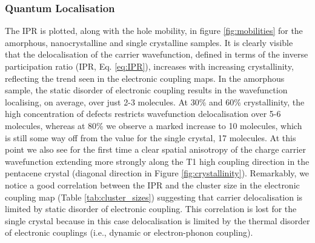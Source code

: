 \subsubsection{Quantum Localisation}
The IPR is plotted, along with the hole mobility, in figure \ref{fig:mobilities} for the amorphous, nanocrystalline and single crystalline samples. It is clearly visible that the delocalisation of the carrier wavefunction, defined in terms of the inverse participation ratio (IPR, Eq. \ref{eq:IPR}), increases with increasing crystallinity, reflecting the trend seen in the electronic coupling maps. In the amorphous sample, the static disorder of electronic coupling results in the wavefunction localising, on average, over just 2-3 molecules. At 30\% and 60\% crystallinity, the high concentration of defects restricts wavefunction delocalisation over 5-6 molecules, whereas at 80\% we observe a marked increase to 10 molecules, which is still some way off from the value for the single crystal, 17 molecules.  At this point we also see for the first time a clear spatial anisotropy of the charge carrier wavefunction extending more strongly along the T1 high coupling direction in the pentacene crystal (diagonal direction in Figure \ref{fig:crystallinity}). Remarkably, we notice a good correlation between the IPR and the cluster size in the electronic coupling map (Table \ref{tab:cluster_sizes}) suggesting that carrier delocalisation is limited by static disorder of electronic coupling. This correlation is lost for the single crystal because in this case delocalisation is limited by the thermal disorder of electronic couplings (i.e., dynamic or electron-phonon coupling). 
